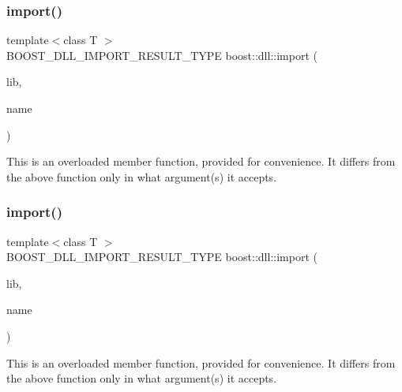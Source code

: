 \subsubsection{\texorpdfstring{import()}{import()}\hspace{0.1cm}{\footnotesize\ttfamily [5/6]}}
{\footnotesize\ttfamily template$<$class T $>$ \\
B\+O\+O\+S\+T\+\_\+\+D\+L\+L\+\_\+\+I\+M\+P\+O\+R\+T\+\_\+\+R\+E\+S\+U\+L\+T\+\_\+\+T\+Y\+PE boost\+::dll\+::import (\begin{DoxyParamCaption}\item[{B\+O\+O\+S\+T\+\_\+\+R\+V\+\_\+\+R\+EF(\hyperlink{a01708}{shared\+\_\+library})}]{lib,  }\item[{const char $\ast$}]{name }\end{DoxyParamCaption})}

This is an overloaded member function, provided for convenience. It differs from the above function only in what argument(s) it accepts. \mbox{\label{a00254_file_a3a30149253feebe550a411593bfb90b5}} 
\subsubsection{\texorpdfstring{import()}{import()}\hspace{0.1cm}{\footnotesize\ttfamily [6/6]}}
{\footnotesize\ttfamily template$<$class T $>$ \\
B\+O\+O\+S\+T\+\_\+\+D\+L\+L\+\_\+\+I\+M\+P\+O\+R\+T\+\_\+\+R\+E\+S\+U\+L\+T\+\_\+\+T\+Y\+PE boost\+::dll\+::import (\begin{DoxyParamCaption}\item[{B\+O\+O\+S\+T\+\_\+\+R\+V\+\_\+\+R\+EF(\hyperlink{a01708}{shared\+\_\+library})}]{lib,  }\item[{const std\+::string \&}]{name }\end{DoxyParamCaption})}

This is an overloaded member function, provided for convenience. It differs from the above function only in what argument(s) it accepts. \mbox{\label{a00254_file_a31e7946affed32f3bebb416ccca9b454}} 
